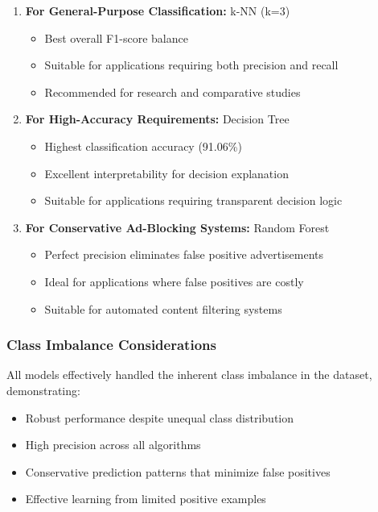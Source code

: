 \begin{enumerate}
    \item \textbf{For General-Purpose Classification:} k-NN (k=3)
    \begin{itemize}
        \item Best overall F1-score balance
        \item Suitable for applications requiring both precision and recall
        \item Recommended for research and comparative studies
    \end{itemize}
    
    \item \textbf{For High-Accuracy Requirements:} Decision Tree
    \begin{itemize}
        \item Highest classification accuracy (91.06\%)
        \item Excellent interpretability for decision explanation
        \item Suitable for applications requiring transparent decision logic
    \end{itemize}
    
    \item \textbf{For Conservative Ad-Blocking Systems:} Random Forest
    \begin{itemize}
        \item Perfect precision eliminates false positive advertisements
        \item Ideal for applications where false positives are costly
        \item Suitable for automated content filtering systems
    \end{itemize}
\end{enumerate}

\subsubsection{Class Imbalance Considerations}

All models effectively handled the inherent class imbalance in the dataset, demonstrating:
\begin{itemize}
    \item Robust performance despite unequal class distribution
    \item High precision across all algorithms
    \item Conservative prediction patterns that minimize false positives
    \item Effective learning from limited positive examples
\end{itemize}

